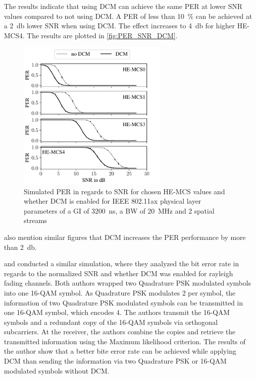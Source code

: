 The results indicate that using \ac{DCM} can achieve the same \ac{PER} at lower \ac{SNR} values compared to not using \ac{DCM}. A \ac{PER} of less than \SI{10}{\percent} can be achieved at
a \SI{2}{\decibel} lower \ac{SNR} when using \ac{DCM}.
The effect increases to \SI{4}{\decibel} for higher HE-\ac{MCS}\num{4}.
The results are plotted in \autoref{fig:PER_SNR_DCM}.
\begin{figure}[H]%
   \centering
   \includegraphics[width=0.65\textwidth]{figures/DCM_PER_to_SNR.pdf}
   \caption{Simulated \ac{PER} in regards to \ac{SNR} for chosen HE-\ac{MCS} values and whether \ac{DCM} is enabled for IEEE 802.11ax physical layer parameters of a \ac{GI} of \SI{3200}{\nano\second}, a \ac{BW} of \SI{20}{\mega\hertz} and 2 spatial streams}%
   \label{fig:PER_SNR_DCM}%
\end{figure}

\textcite{khorov_ieee_2015} also mention similar figures that \ac{DCM} increases the \ac{PER} performance by more than \SI{2}{\decibel}.

\textcite{ryu_ber_2010} and \textcite{park_ber_2006} conducted a similar simulation, where they analyzed the bit error rate in
regards to the normalized \ac{SNR} and whether \ac{DCM} was enabled for rayleigh fading channels.
Both authors wrapped two Quadrature \ac{PSK} modulated symbols into one 16-\ac{QAM} symbol.
As Quadrature \ac{PSK} modulates \SI{2}{\bit} per symbol, the information of two Quadrature \ac{PSK} modulated symbols can be
transmitted in one 16-\ac{QAM} symbol, which encodes \SI{4}{\bit}.
The authors transmit the 16-\ac{QAM} symbols and a redundant copy
of the 16-\ac{QAM} symbols via orthogonal subcarriers.
At the receiver, the authors combine the copies and retrieve the transmitted
information using the Maximum likelihood criterion.
The results of the author show that a better bite error rate can be achieved while applying
\ac{DCM} than sending the information via two Quadrature \ac{PSK} or 16-\ac{QAM} modulated symbols without \ac{DCM}.



